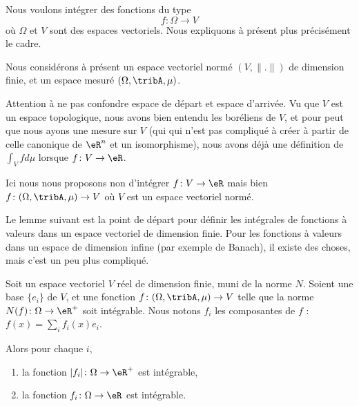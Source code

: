 Nous voulons intégrer des fonctions du type
\begin{equation}
    f\colon \Omega\to V
\end{equation}
où \( \Omega\) et \( V\) sont des espaces vectoriels. Nous expliquons à présent plus précisément le cadre.

\begin{normaltext}      \label{NORMooTQBIooBaScjt}
    Nous considérons à présent un espace vectoriel normé \( (V,\| . \|)\) de dimension finie, et un espace mesuré \( (\Omega,\tribA,\mu)\).

    Attention à ne pas confondre espace de départ et espace d'arrivée. Vu que \( V\) est un espace topologique, nous avons bien entendu les boréliens de \( V\), et pour peut que nous ayons une mesure sur \( V\) (qui qui n'est pas compliqué à créer à partir de celle canonique de \( \eR^n\) et un isomorphisme), nous avons déjà une définition de \( \int_Vfd\mu\) lorsque \( f\colon V\to \eR\).

    Ici nous nous proposons non d'intégrer \( f\colon V\to \eR\) mais bien \( f\colon (\Omega,\tribA,\mu)\to V\) où \( V\) est un espace vectoriel normé.

    Le lemme suivant est la point de départ pour définir les intégrales de fonctions à valeurs dans un espace vectoriel de dimension finie. Pour les fonctions à valeurs dans un espace de dimension infine (par exemple de Banach), il existe des choses, mais c'est un peu plus compliqué.
\end{normaltext}

\begin{lemma}        \label{LEMooCVHDooLJASAs}
    Soit un espace vectoriel \( V\) réel de dimension finie, muni de la norme \( N\). Soient une base \( \{ e_i \}\) de \( V\), et une fonction \( f\colon (\Omega,\tribA,\mu)\to V\) telle que la norme \( N(f)\colon \Omega\to \eR^+\) soit intégrable. Nous notons \( f_i\) les composantes de \( f\) : \( f(x)=\sum_if_i(x)e_i\).

    Alors pour chaque \( i\),
    \begin{enumerate}
        \item
            la fonction \( | f_i |\colon \Omega\to \eR^+\) est intégrable,
        \item
            la fonction \( f_i\colon \Omega\to \eR\) est intégrable.
    \end{enumerate}
\end{lemma}

